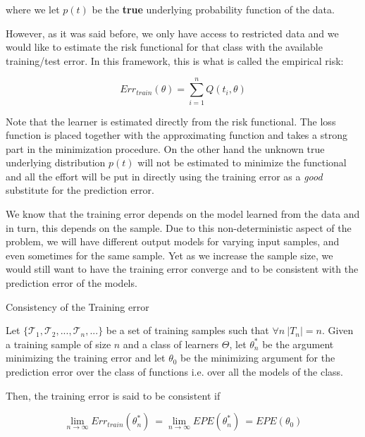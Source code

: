 where we let $p(t)$ be the \textbf{true} underlying probability function of the data.

However, as it was said before, we only have access to restricted data and we would like to estimate the risk functional for that class with the available training/test error. In this framework, this is what is called the empirical risk:

\begin{equation}\label{vapnik-empiricalRisk}
Err_{train}(\theta) = \sum_{i=1}^n Q(t_i,\theta)
\end{equation}

Note that the learner is estimated directly from the risk functional. The loss function is placed together with the approximating function and takes a strong part in the minimization procedure. On the other hand the unknown true underlying distribution $p(t)$ will not be estimated to minimize the functional and all the effort will be put in directly using the training error as a \textit{good} substitute for the prediction error.


We know that the training error depends on the model learned from the data and in turn, this depends on the sample. Due to this non-deterministic aspect of the problem, we will have different output models for varying input samples, and even sometimes for the same sample. Yet as we increase the sample size, we would still want to have the training error converge and to be consistent with the prediction error of the models.



\begin{definition}{Consistency of the Training error}

Let $\{\mathcal {T}_1, \mathcal {T}_2, ..., \mathcal {T}_n, ... \}$ be a set of training samples such that $\forall n \ |T_n|=n$. Given a training sample of size $n$ and a class of learners $\Theta$, let $\theta^{*}_n$ be the argument minimizing the training error and let $\theta_0$ be the minimizing argument for the prediction error over the class of functions i.e. over all the models of the class.

Then, the training error is said to be consistent if

\begin{equation}
\lim_{n\to\infty} Err_{train}(\theta^{*}_n) \ = \lim_{n\to\infty} EPE(\theta^{*}_n) \ = EPE(\theta_0)
\end{equation}

\end{definition}

